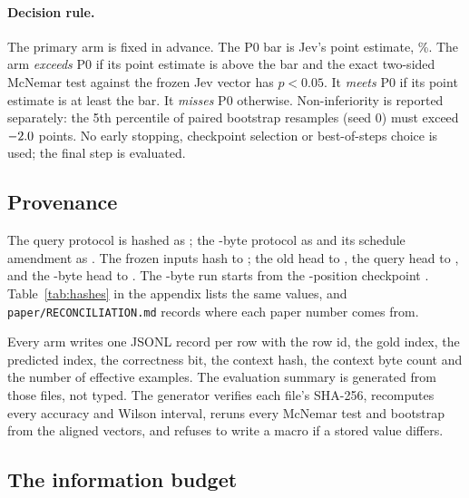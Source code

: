 \documentclass[11pt]{article}
\begin{document}
\paragraph{Decision rule.}\label{sec:decision} The primary arm is fixed in advance. The P0 bar is
Jev's point estimate, \PBar\%. The arm \emph{exceeds} P0 if its point estimate
is above the bar and the exact two-sided McNemar test against the frozen Jev
vector has $p<0.05$. It \emph{meets} P0 if its point estimate is at least the
bar. It \emph{misses} P0 otherwise. Non-inferiority is reported separately: the
5th percentile of \PBOOT{} paired bootstrap resamples (seed 0) must exceed
$-2.0$ points. No early stopping, checkpoint selection or best-of-steps choice
is used; the final step is evaluated.



\subsection{Provenance}

The query protocol is hashed as \texttt{\PQueryPrereg}; the \PSeq-byte
protocol as \texttt{\PLenPrereg} and its schedule amendment as
\texttt{\PLenAmendment}. The frozen inputs hash to \texttt{\PInputs}; the old
head to \texttt{\POldHead}, the query head to \texttt{\PQueryHead}, and the
\PSeq-byte head to \texttt{\PLenHead}. The \PSeq-byte run starts from the
\PNativeSeq-position checkpoint \texttt{\PLenInit}. Table~\ref{tab:hashes} in
the appendix lists the same values, and \texttt{paper/RECONCILIATION.md}
records where each paper number comes from.

Every arm writes one JSONL record per row with the row id, the gold index, the
predicted index, the correctness bit, the context hash, the context byte count
and the number of effective examples. The evaluation summary is generated from
those files, not typed. The generator verifies each file's SHA-256, recomputes
every accuracy and Wilson interval, reruns every McNemar test and bootstrap
from the aligned vectors, and refuses to write a macro if a stored value
differs.

\subsection{The information budget}
\end{document}
